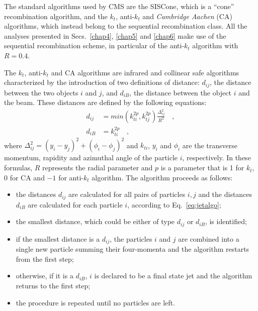 The standard algorithms used by CMS are the SISCone, which is a ``cone'' recombination algorithm, and the $k_t$, anti-$k_t$ and \emph{Cambridge Aachen} (CA) algorithms, which instead belong to the sequential recombination class.
All the analyses presented in Secs.~\ref{chap4}, \ref{chap5} and \ref{chap6} make use of the sequential recombination scheme, in particular of the anti-$k_t$ algorithm with $R=0.4$.

The $k_t$, anti-$k_t$ and CA algorithms are infrared and collinear safe algorithms characterized by the introduction of two definitions of distance: $d_{ij}$, the distance between the two objects $i$ and $j$, and $d_{iB}$, the distance between the object $i$ and the beam. These distances are defined by the following equations:
\begin{equation}\label{eq:jetalgo}
\begin{split}
d_{ij} &= min\left(k_{ti}^{2p}, k_{tj}^{2p} \right) \frac{\Delta_{ij}^2}{R^2} \quad,\\
d_{iB} &= k_{ti}^{2p} \quad,
\end{split}
\end{equation}
where $\Delta_{ij}^2 = (y_i - y_j)^2 + (\phi_i - \phi_j)^2$ and $k_{ti}$, $y_i$ and $\phi_i$ are the transverse momentum, rapidity and azimuthal angle of the particle $i$, respectively. In these formulas, $R$ represents the radial parameter and $p$ is a parameter that is 1 for $k_t$, 0 for CA and $-1$ for anti-$k_t$ algorithm. The algorithm proceeds as follows:
\begin{itemize}
\item the distances $d_{ij}$ are calculated for all pairs of particles $i,j$ and the distances $d_{iB}$ are calculated for each particle $i$, according to Eq.~\eqref{eq:jetalgo};
\item the smallest distance, which could be either of type $d_{ij}$ or $d_{iB}$, is identified;
\item if the smallest distance is a $d_{ij}$, the particles $i$ and $j$ are combined into a single new particle summing their four-momenta and the algorithm restarts from the first step;
\item otherwise, if it is a $d_{iB}$, $i$ is declared to be a final state jet and the algorithm returns to the first step;
\item the procedure is repeated until no particles are left.
\end{itemize}

